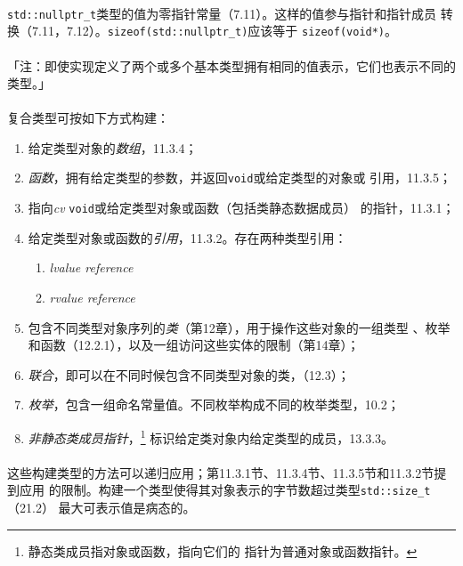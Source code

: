 \paragraph{}
\texttt{std::nullptr\_t}类型的值为零指针常量（7.11）。这样的值参与指针和指针成员
转换（7.11，7.12）。\texttt{sizeof(std::nullptr\_t)}应该等于
\texttt{sizeof(void*)}。

\paragraph{}
「注：即使实现定义了两个或多个基本类型拥有相同的值表示，它们也表示不同的类型。」

\paragraph{}
复合类型可按如下方式构建：
\begin{enumerate}
  \item{给定类型对象的\textit{数组}，11.3.4；}
  \item{\textit{函数}，拥有给定类型的参数，并返回\texttt{void}或给定类型的对象或
    引用，11.3.5；}
  \item{指向\textit{cv} \texttt{void}或给定类型对象或函数（包括类静态数据成员）
    的指针，11.3.1；}
  \item{给定类型对象或函数的\textit{引用}，11.3.2。存在两种类型引用：
      \begin{enumerate}
        \item{\textit{lvalue reference}}
        \item{\textit{rvalue reference}}
    \end{enumerate}}
  \item{包含不同类型对象序列的\textit{类}（第12章），用于操作这些对象的一组类型
    、枚举和函数（12.2.1），以及一组访问这些实体的限制（第14章）；}
  \item{\textit{联合}，即可以在不同时候包含不同类型对象的类，（12.3）；}
  \item{\textit{枚举}，包含一组命名常量值。不同枚举构成不同的枚举类型，10.2；}
  \item{\textit{非静态类成员指针}，\footnote{静态类成员指对象或函数，指向它们的
    指针为普通对象或函数指针。} 标识给定类对象内给定类型的成员，13.3.3。}
\end{enumerate}

\paragraph{}
这些构建类型的方法可以递归应用；第11.3.1节、11.3.4节、11.3.5节和11.3.2节提到应用
的限制。构建一个类型使得其对象表示的字节数超过类型\texttt{std::size\_t}（21.2）
最大可表示值是病态的。

